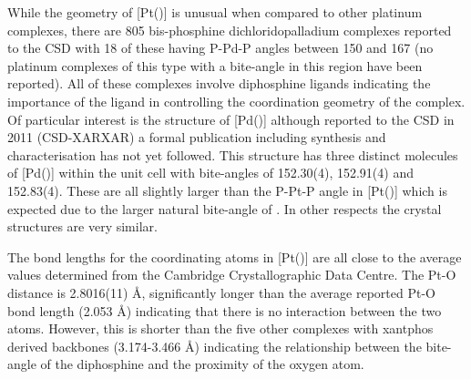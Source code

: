 While the geometry of [Pt(\tButhixantphos)] is unusual when compared to other platinum complexes, there are 805 bis-phosphine dichloridopalladium complexes reported to the \gls{CSD} with 18 of these having P-Pd-P angles between 150 and 167\degrees{} (no platinum complexes of this type with a bite-angle in this region have been reported).\cite{Allen2002}  All of these complexes involve diphosphine ligands indicating the importance of the ligand in controlling the coordination geometry of the complex.  Of particular interest is the structure of [Pd(\tBuxantphos)] although reported to the \gls{CSD} in 2011 (CSD-XARXAR) a formal publication including synthesis and characterisation has not yet followed.\cite{Allen2002}  This structure has three distinct molecules of [Pd(\tBuxantphos)] within the unit cell with bite-angles of 152.30(4), 152.91(4) and 152.83(4)\degrees.  These are all slightly larger than the P-Pt-P angle in [Pt(\tButhixantphos)] which is expected due to the larger natural bite-angle of \tBuxantphos{}.  In other respects the crystal structures are very similar.  

The bond lengths for the coordinating atoms in [Pt(\tButhixantphos)] are all close to the average values determined from the Cambridge Crystallographic Data Centre.  The Pt-O distance is 2.8016(11) \si{\angstrom}, significantly longer than the average reported Pt-O bond length (2.053 \si{\angstrom}) indicating that there is no interaction between the two atoms.  However, this is shorter than the five other complexes with xantphos derived backbones (3.174-3.466 \si{\angstrom}) indicating the relationship between the bite-angle of the diphosphine and the proximity of the oxygen atom.  

